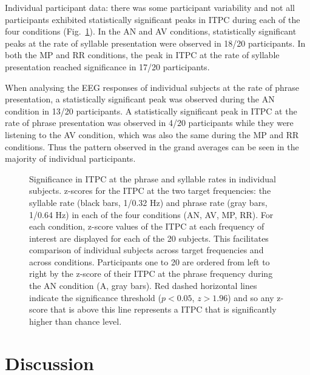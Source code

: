 \documentclass[10pt,letterpaper]{article}
\begin{document}
Individual participant data: there was some participant
variability and not all participants exhibited statistically
significant peaks in ITPC during each of the four conditions
(Fig.~\ref{fig:Fig3}). In the AN and AV conditions, statistically
significant peaks at the rate of syllable presentation were observed
in 18/20 participants. In both the MP and RR conditions, the peak in
ITPC at the rate of syllable presentation reached significance in
17/20 participants.

When analysing the EEG responses of individual subjects at the rate of
phrase presentation, a statistically significant peak was observed
during the AN condition in 13/20 participants. A statistically
significant peak in ITPC at the rate of phrase presentation was
observed in 4/20 participants while they were listening to the AV
condition, which was also the same during the MP and RR
conditions. Thus the pattern observed in the grand averages can be
seen in the majority of individual participants.

\begin{figure}[tbhp]

  \caption{Significance in ITPC at the phrase and syllable rates in individual subjects. z-scores for the ITPC at the two target frequencies: the syllable rate (black bars, 1/0.32 Hz) and phrase rate (gray bars, 1/0.64 Hz) in each of the four conditions (AN, AV, MP, RR). For each condition, z-score values of the ITPC at each frequency of interest are displayed for each of the 20 subjects. This facilitates comparison of individual subjects across target frequencies and across conditions. Participants one to 20 are ordered from left to right by the z-score of their ITPC at the phrase frequency during the AN condition (A, gray bars). Red dashed horizontal lines indicate the significance threshold ($p<0.05$, $z>1.96$) and so any z-score that is above this line represents a  ITPC that is significantly higher than chance level.}
\label{fig:Fig3}
\end{figure}


\section*{Discussion}
\end{document}
